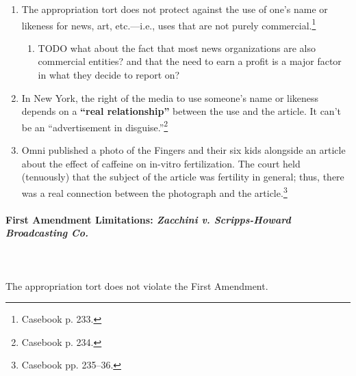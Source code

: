 \begin{enumerate}
    \item The appropriation tort does not protect against the use of one's name 
    or likeness for news, art, etc.---i.e., uses that are not purely 
    commercial.\footnote{Casebook p. 233.}
    \begin{enumerate}
        \item TODO what about the fact that most news organizations are also 
        commercial entities? and that the need to earn a profit is a major 
        factor in what they decide to report on?
    \end{enumerate}
    \item In New York, the right of the media to use someone's name or likeness 
    depends on a \textbf{``real relationship''} between the use and the article. 
    It can't be an ``advertisement in disguise.''\footnote{Casebook p. 234.}
    \item Omni published a photo of the Fingers and their six kids alongside an 
    article about the effect of caffeine on in-vitro fertilization. The court 
    held (tenuously) that the subject of the article was fertility in general; 
    thus, there was a real connection between the photograph and the 
    article.\footnote{Casebook pp. 235--36.}
\end{enumerate}

\paragraph{First Amendment Limitations: \emph{Zacchini v. Scripps-Howard 
Broadcasting Co.}}
~\\\\
The appropriation tort does not violate the First Amendment.

